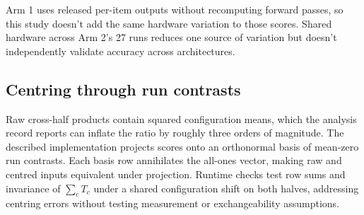 Arm 1 uses released per-item outputs without recomputing forward passes, so this study doesn't add the same hardware variation to those scores. Shared hardware across Arm 2's 27 runs reduces one source of variation but doesn't independently validate accuracy across architectures.

\subsection{Centring through run contrasts}
Raw cross-half products contain squared configuration means, which the analysis record reports can inflate the ratio by roughly three orders of magnitude. The described implementation projects scores onto an orthonormal basis of mean-zero run contrasts. Each basis row annihilates the all-ones vector, making raw and centred inputs equivalent under projection. Runtime checks test row sums and invariance of $\sum_c T_c$ under a shared configuration shift on both halves, addressing centring errors without testing measurement or exchangeability assumptions.
